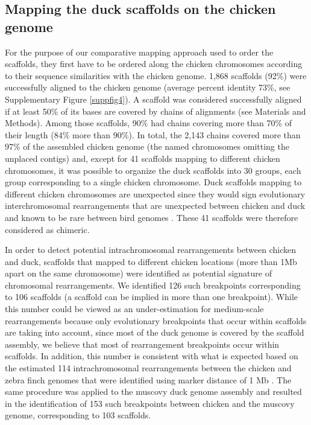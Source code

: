 \documentclass[10pt,letterpaper]{article}
\begin{document}

\subsection*{Mapping the duck scaffolds on the chicken genome}

For the purpose of our comparative mapping approach used to order the scaffolds, they first have to be ordered along the chicken chromosomes according to their sequence similarities with the chicken genome. 1,868 scaffolds (92\%) were successfully aligned to the chicken genome (average percent identity 73\%, see Supplementary Figure \ref{suppfig4}). A scaffold was considered successfully aligned if at least 50\% of its bases are covered by chains of alignments (see Materials and Methods). Among those scaffolds, 90\% had chains covering more than 70\% of their length (84\% more than 90\%). In total, the 2,143 chains covered more than 97\% of the assembled chicken genome (the named chromosomes omitting the unplaced contigs) and, except for 41 scaffolds mapping to different chicken chromosomes, it was possible to organize the duck scaffolds into 30 groups, each group corresponding to a single chicken chromosome. Duck scaffolds mapping to different chicken chromosomes are unexpected since they would sign evolutionary interchromosomal rearrangements that are unexpected between chicken and duck \cite{Wojcik2017} and known to be rare between bird genomes \cite{Zhang2014}. These 41 scaffolds were therefore considered as chimeric.

In order to detect potential intrachromosomal rearrangements between chicken and duck, scaffolds that mapped to different chicken locations (more than 1Mb apart on the same chromosome) were identified as potential signature of chromosomal rearrangements. We identified 126 such breakpoints corresponding to 106 scaffolds (a scaffold can be implied in more than one breakpoint). While this number could be viewed as an under-estimation for medium-scale rearrangements because only evolutionary breakpoints that occur within scaffolds are taking into account, since most of the duck genome is covered by the scaffold assembly, we believe that most of rearrangement breakpoints occur within scaffolds. In addition, this number is consistent with what is expected based on the estimated 114 intrachromosomal rearrangements between the chicken and zebra finch genomes that were identified using marker distance of 1 Mb \cite{Volker2010}. The same procedure was applied to the muscovy duck genome assembly and resulted in the identification of 153 such breakpoints between chicken and the muscovy genome, corresponding to 103 scaffolds.
\end{document}
